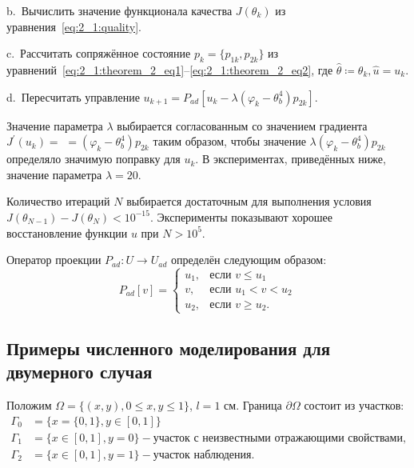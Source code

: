 \hspace{1cm} b.\ Вычислить значение функционала качества
$J(\theta_k)$ из уравнения~\eqref{eq:2_1:quality}.

\hspace{1cm} c.\ Рассчитать сопряжённое состояние $p_k=\{p_{1k},p_{2k}\}$ из
уравнений~\eqref{eq:2_1:theorem_2_eq1}--\eqref{eq:2_1:theorem_2_eq2},
где $ \hat{\theta} \coloneqq \theta_k, \hat{u}=u_k$.

\hspace{1cm} d.\  Пересчитать управление
$u_{k+1} = P_{ad}\left[ u_k - \lambda (\varphi_k - \theta_b^4)p_{2k} \right]$.


Значение параметра $\lambda$ выбирается согласованным со значением
градиента $J^{\prime}\left(u_{k}\right)=$ $=\left(\varphi_{k}-\theta_{b}^{4}\right) p_{2k}$
таким образом, чтобы значение $\lambda\left(\varphi_{k}-\theta_{b}^{4}\right) p_{2k}$
определяло значимую поправку для $u_{k}$.
В экспериментах, приведённых ниже, значение параметра $\lambda=20$.

Количество итераций $N$ выбирается достаточным для выполнения условия
$J\left(\theta_{N-1}\right)-J\left(\theta_{N}\right)<10^{-15}$.
Эксперименты показывают хорошее восстановление функции $u$ при $N>10^{5}$.

Оператор проекции $P_{ad} : U \to U_{ad}$ определён следующим образом:
\[
    P_{ad}[v] =
    \begin{cases}
        u_1, & \text{если } v \le u_1 \\
        v, & \text{если } u_1 < v < u_2 \\
        u_2, & \text{если } v \ge u_2.
    \end{cases}
\]

\subsection{Примеры численного моделирования для двумерного случая}
\label{subsec:ch4/sec3/numeric-samples}

Положим $\Omega = \{(x,y), 0 \leq x,y \leq 1\}$, $l = 1$ см.
Граница $\partial\Omega$ состоит из участков:
\[
    \begin{aligned}
        \Gamma_0 & = \{x=\{0,1\}, y \in [0,1]\} \\
        \Gamma_1 & = \{x\in [0,1], y=0\}
        - \text{участок с неизвестными отражающими свойствами}, \\
        \Gamma_2 & = \{x \in [0,1], y=1\} - \text{участок наблюдения}.
    \end{aligned}
\]

